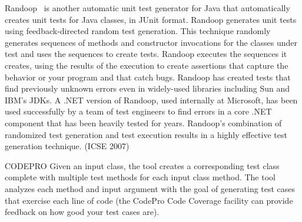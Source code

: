 Randoop~\cite{pacheco2007feedback} is another automatic unit test generator for Java that automatically creates unit tests for Java classes, in JUnit format.  Randoop generates unit tests using feedback-directed random test generation. This technique randomly generates sequences of methods and constructor invocations for the classes under test and uses the sequences to create tests. Randoop executes the sequences it creates, using the results of the execution to create assertions that capture the behavior or your program and that catch bugs.
    Randoop has created tests that find previously unknown errors even in widely-used libraries including Sun and IBM's JDKs. A .NET version of Randoop, used internally at Microsoft, has been used successfully by a team of test engineers to find errors in a core .NET component that has been heavily tested for years. Randoop's combination of randomized test generation and test execution results in a highly effective test generation technique.  (ICSE 2007)

CODEPRO  Given an input class, the tool creates a corresponding test class complete with multiple test methods for each input class method. The tool analyzes each method and input argument with the goal of generating test cases that exercise each line of code (the CodePro Code Coverage facility can provide feedback on how good your test cases are).
 